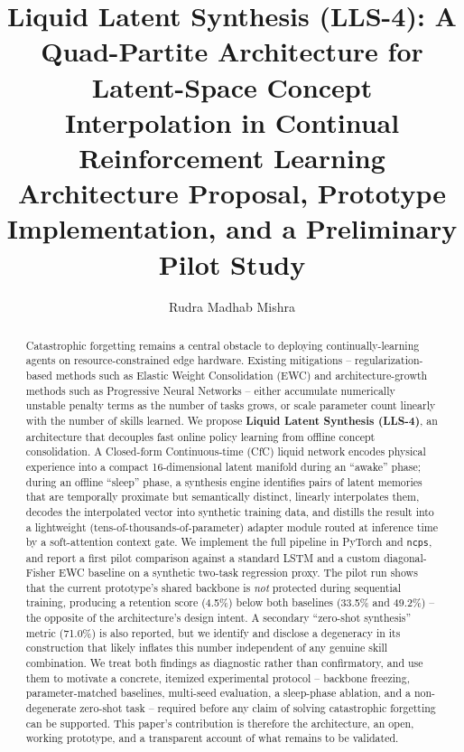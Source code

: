 \documentclass[11pt]{article}
\title{\textbf{Liquid Latent Synthesis (LLS-4): A Quad-Partite Architecture for Latent-Space Concept Interpolation in Continual Reinforcement Learning}\\[4pt]
\large Architecture Proposal, Prototype Implementation, and a Preliminary Pilot Study}
\author[1]{Rudra Madhab Mishra}
\affil[1]{Department of Computer Science and Engineering (AI \& ML), GIET University, Gunupur, Rayagada, Odisha, India \\ \texttt{rudramdhabmishra1@gmail.com}}
\date{}
\begin{document}
\maketitle

\begin{abstract}
Catastrophic forgetting remains a central obstacle to deploying continually-learning agents on resource-constrained edge hardware. Existing mitigations -- regularization-based methods such as Elastic Weight Consolidation (EWC) and architecture-growth methods such as Progressive Neural Networks -- either accumulate numerically unstable penalty terms as the number of tasks grows, or scale parameter count linearly with the number of skills learned. We propose \textbf{Liquid Latent Synthesis (LLS-4)}, an architecture that decouples fast online policy learning from offline concept consolidation. A Closed-form Continuous-time (CfC) liquid network encodes physical experience into a compact 16-dimensional latent manifold during an ``awake'' phase; during an offline ``sleep'' phase, a synthesis engine identifies pairs of latent memories that are temporally proximate but semantically distinct, linearly interpolates them, decodes the interpolated vector into synthetic training data, and distills the result into a lightweight (tens-of-thousands-of-parameter) adapter module routed at inference time by a soft-attention context gate. We implement the full pipeline in PyTorch and \texttt{ncps}, and report a first pilot comparison against a standard LSTM and a custom diagonal-Fisher EWC baseline on a synthetic two-task regression proxy. The pilot run shows that the current prototype's shared backbone is \emph{not} protected during sequential training, producing a retention score (4.5\%) below both baselines (33.5\% and 49.2\%) -- the opposite of the architecture's design intent. A secondary ``zero-shot synthesis'' metric (71.0\%) is also reported, but we identify and disclose a degeneracy in its construction that likely inflates this number independent of any genuine skill combination. We treat both findings as diagnostic rather than confirmatory, and use them to motivate a concrete, itemized experimental protocol -- backbone freezing, parameter-matched baselines, multi-seed evaluation, a sleep-phase ablation, and a non-degenerate zero-shot task -- required before any claim of solving catastrophic forgetting can be supported. This paper's contribution is therefore the architecture, an open, working prototype, and a transparent account of what remains to be validated.
\end{abstract}
\end{document}
